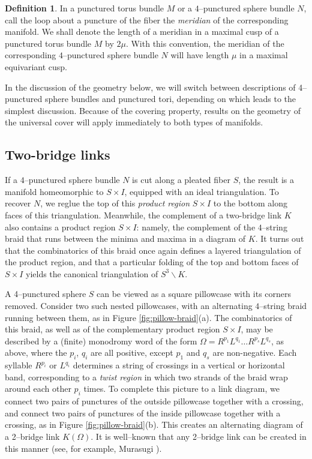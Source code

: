 \documentclass[11pt]{amsart}
\renewcommand{\setminus}{{\smallsetminus}}
\theoremstyle{plain}
\theoremstyle{definition}
\newtheorem{define}[theorem]{Definition}
\begin{document}
\begin{define}\label{def:fibered-meridian}
In a punctured torus bundle $M$ or a $4$--punctured sphere bundle $N$,
call the loop about a puncture of the fiber the \emph{meridian} of the
corresponding manifold.  We shall denote the length of a meridian in a
maximal cusp of a punctured torus bundle $M$ by $2\mu$.  With this
convention, the meridian of the corresponding $4$--punctured sphere
bundle $N$ will have length $\mu$ in a maximal equivariant cusp.
\end{define}

In the discussion of the geometry below, we will switch between
descriptions of 4--punctured sphere bundles and punctured tori,
depending on which leads to the simplest discussion.  Because of the
covering property, results on the geometry of the universal cover will
apply immediately to both types of manifolds.

\subsection{Two-bridge links}\label{sec:2bridge}

If a $4$--punctured sphere bundle $N$ is cut along a pleated fiber
$S$, the result is a manifold homeomorphic to $S \times I$, equipped
with an ideal triangulation. To recover $N$, we reglue the top of this
\emph{product region} $S \times I$ to the bottom along faces of this
triangulation. Meanwhile, the complement of a two-bridge link $K$ also
contains a product region $S \times I$: namely, the complement of the
$4$--string braid that runs between the minima and maxima in a diagram
of $K$. It turns out that the combinatorics of this braid once again
defines a layered triangulation of the product region, and that a
particular folding of the top and bottom faces of $S \times I$ yields
the canonical triangulation of $S^3 \setminus K$.

A 4--punctured sphere $S$ can be viewed as a square pillowcase with
its corners removed.  Consider two such nested pillowcases, with an
alternating $4$--string braid running between them, as in Figure
\ref{fig:pillow-braid}(a). The combinatorics of this braid, as well as
of the complementary product region $S \times I$, may be described by
a (finite) monodromy word of the form $\Omega = R^{p_1}L^{q_1}\dots
R^{p_s}L^{q_s}$, as above, where the $p_i$, $q_i$ are all positive,
except $p_1$ and $q_s$ are non-negative.  Each syllable $R^{p_i}$ or
$L^{q_i}$ determines a string of crossings in a vertical or horizontal
band, corresponding to a \emph{twist region} in which two strands of
the braid wrap around each other $p_i$ times.  To complete this
picture to a link diagram, we connect two pairs of punctures of the
outside pillowcase together with a crossing, and connect two pairs of
punctures of the inside pillowcase together with a crossing, as in
Figure \ref{fig:pillow-braid}(b).  This creates an alternating diagram
of a 2--bridge link $K(\Omega)$. It is well--known that any 2--bridge
link can be created in this manner (see, for example, Murasugi
\cite[Theorems 9.3.1 and 9.3.2]{murasugi}).
\end{document}
